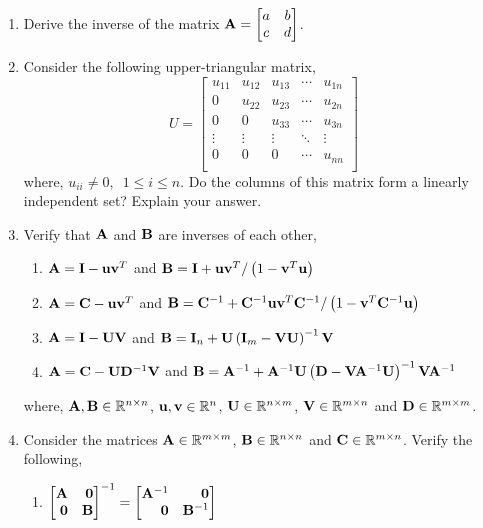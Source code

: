 \documentclass[12pt]{article}
\def\mf{\ensuremath\mathbf}
\def\mb{\ensuremath\mathbb}
\def\lp{\ensuremath\left(}
\def\rp{\ensuremath\right)}
\def\bmx{\ensuremath\begin{bmatrix*}[r]}
\def\emx{\ensuremath\end{bmatrix*}}
\begin{document}
\begin{enumerate}
\item Derive the inverse of the matrix $\mf{A} = \begin{bmatrix}a & b\\c & d\end{bmatrix}$.

\item Consider the following upper-triangular matrix, 
$$U = \begin{bmatrix}
u_{11} & u_{12} & u_{13} & \cdots & u_{1n}\\
0 & u_{22} & u_{23} & \cdots & u_{2n}\\
0 & 0 & u_{33} & \cdots & u_{3n}\\
\vdots & \vdots & \vdots & \ddots & \vdots\\
0 & 0 & 0 & \cdots & u_{nn}\\\end{bmatrix}$$
where, $u_{ii} \neq 0, \,\,\, 1 \leq i \leq n$. Do the columns of this matrix form a linearly independent set? Explain your answer.

\item Verify that $\mf{A}$ and $\mf{B}$ are inverses of each other,
\begin{enumerate}
    \item $\mf{A} = \mf{I} - \mf{u}\mf{v}^T$ and $\mf{B} = \mf{I} + \mf{u}\mf{v}^T / \lp 1 - \mf{v}^T\mf{u} \rp$
    \item $\mf{A} = \mf{C} - \mf{u}\mf{v}^T$ and $\mf{B} = \mf{C}^{-1} + \mf{C}^{-1}\mf{u}\mf{v}^T\mf{C}^{-1} / \lp 1 - \mf{v}^T\mf{C}^{-1}\mf{u} \rp$
    \item $\mf{A} = \mf{I} - \mf{U}\mf{V}$ and $\mf{B} = \mf{I}_{n} + \mf{U}\lp \mf{I}_m - \mf{V}\mf{U}\rp^{-1}\mf{V}$
    \item $\mf{A} = \mf{C} - \mf{U}\mf{D}^{-1}\mf{V}$ and $\mf{B} = \mf{A}^{-1} + \mf{A}^{-1}\mf{U}\lp \mf{D} - \mf{V}\mf{A}^{-1}\mf{U}\rp^{-1}\mf{V}\mf{A}^{-1}$
\end{enumerate}
where, $\mf{A}, \mf{B} \in \mb{R}^{n \times n}$, $\mf{u}, \mf{v} \in \mb{R}^n$, $\mf{U} \in \mb{R}^{n \times m}$, $\mf{V} \in \mb{R}^{m \times n}$ and $\mf{D} \in \mb{R}^{m \times m}$.

\item Consider the matrices $\mf{A} \in \mb{R}^{m \times m}$, $\mf{B} \in \mb{R}^{n \times n}$ and $\mf{C} \in \mb{R}^{m \times n}$. Verify the following,
\begin{enumerate}
    \item $\bmx \mf{A} & \mf{0} \\ \mf{0} & \mf{B}\emx^{-1} = \bmx \mf{A}^{-1} & \mf{0} \\ \mf{0} & \mf{B}^{-1}\emx$
\end{enumerate}
\end{enumerate}
\end{document}
